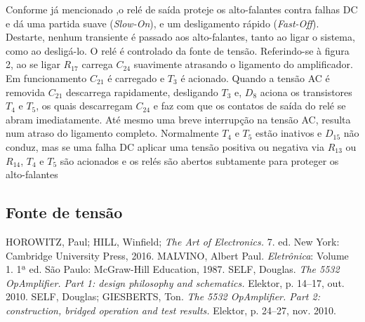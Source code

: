 \documentclass[12pt, a4paper, leqno, twoside]{book}
\begin{document}
  Conforme j\'a mencionado ,o rel\'e de sa\'ida proteje os alto-falantes contra falhas DC e d\'a uma partida suave ({\it Slow-On}\/), e um desligamento r\'apido ({\it Fast-Off}\/). Destarte, nenhum transiente \'e passado aos alto-falantes, tanto ao ligar o sistema, como ao deslig\'a-lo. O rel\'e \'e controlado da fonte de tens\~ao. Referindo-se \`a figura 2, ao se ligar $R_{17}$ carrega $C_24$ suavimente atrasando o ligamento do amplificador. Em funcionamento $C_{21}$ \'e carregado e $T_3$ \'e acionado. Quando a tens\~ao AC \'e removida $C_{21}$ descarrega rapidamente, desligando $T_3$ e, $D_8$ aciona os transistores $T_4$ e $T_5$, os quais descarregam $C_{24}$ e faz com que os contatos de sa\'ida do rel\'e se abram imediatamente. At\'e mesmo uma breve interrup\c c\~ao na tens\~ao AC, resulta num atraso do ligamento completo. Normalmente $T_4$ e $T_5$ est\~ao inativos e $D_{15}$ n\~ao conduz, mas se uma falha DC aplicar uma tens\~ao positiva ou negativa via $R_{13}$ ou $R_{14}$, $T_4$ e $T_5$ s\~ao acionados e os rel\'es s\~ao abertos subtamente para proteger os alto-falantes

  \subsection{Fonte de tens\~ao}
  \begin{thebibliography}{}
    HOROWITZ, Paul; HILL, Winfield; {\it The Art of Electronics.} 7. ed. New York: Cambridge University Press, 2016.
    MALVINO, Albert Paul. {\it Eletr\^onica\/}: Volume 1. 1ª ed. S\~ao Paulo: McGraw-Hill Education, 1987.
    SELF, Douglas. {\it The 5532 OpAmplifier. Part 1: design philosophy and schematics.} Elektor, p. 14--17, out. 2010.
    SELF, Douglas; GIESBERTS, Ton. {\it The 5532 OpAmplifier. Part 2: construction, bridged operation and test results.} Elektor, p. 24--27, nov. 2010.
  \end{thebibliography}
\end{document}
